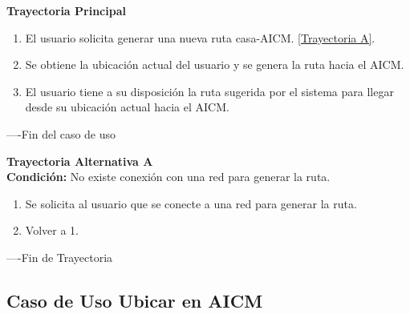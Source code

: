 \begin{flushleft}
	\textbf{Trayectoria Principal}\\
	\begin{enumerate}
		\item El usuario solicita generar una nueva ruta casa-AICM. \hyperlink{TrayectoriaA_CU-U-07}{[Trayectoria A]}.
		\item Se obtiene la ubicación actual del usuario y se genera la ruta hacia el AICM.
		\item El usuario tiene a su disposición la ruta sugerida por el sistema para llegar desde su ubicación actual hacia el AICM.
	\end{enumerate}
\end{flushleft}
----Fin del caso de uso

\begin{flushleft}
	\hypertarget{TrayectoriaA_CU-U-07}{}
	\textbf{Trayectoria Alternativa A}\\
	\textbf{Condición:} No existe conexión con una red para generar la ruta. \\
	\begin{enumerate}
		\item Se solicita al usuario que se conecte a una red para generar la ruta. 
		\item Volver a 1.
	\end{enumerate}
\end{flushleft}
----Fin de Trayectoria

\subsection{Caso de Uso Ubicar en AICM}

